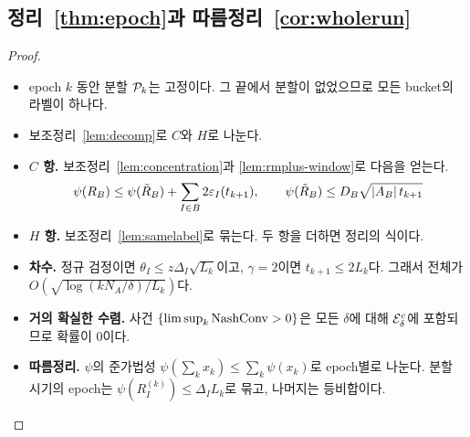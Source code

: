 \subsection{정리~\ref{thm:epoch}과 따름정리~\ref{cor:wholerun}}
\begin{proof}\mbox{}
\begin{itemize}
  \item epoch $k$ 동안 분할 $\mathcal{P}_k$는 고정이다. 그 끝에서 분할이 없었으므로 모든 bucket의 라벨이 하나다.
  \item 보조정리~\ref{lem:decomp}로 $C$와 $H$로 나눈다.
  \item \textbf{$C$ 항.} 보조정리~\ref{lem:concentration}과 \ref{lem:rmplus-window}로 다음을 얻는다.
    \[
    \psi(R_B)\le\psi(\tilde R_B)+\sum_{I\in B}2\varepsilon_I(t_{k+1}),\qquad\psi(\tilde R_B)\le D_B\sqrt{\left\lvert A_B\right\rvert t_{k+1}}
    \]
  \item \textbf{$H$ 항.} 보조정리~\ref{lem:samelabel}로 묶는다. 두 항을 더하면 정리의 식이다.
  \item \textbf{차수.} 정규 검정이면 $\theta_I\le z\Delta_I\sqrt{L_k}$이고, $\gamma=2$이면 $t_{k+1}\le2L_k$다. 그래서 전체가 $O(\sqrt{\log(kN_A/\delta)/L_k})$다.
  \item \textbf{거의 확실한 수렴.} 사건 $\{\limsup_k\mathrm{NashConv}>0\}$은 모든 $\delta$에 대해 $\mathcal{E}_\delta^c$에 포함되므로 확률이 0이다.
  \item \textbf{따름정리.} $\psi$의 준가법성 $\psi(\sum_kx_k)\le\sum_k\psi(x_k)$로 epoch별로 나눈다. 분할 시기의 epoch는 $\psi(R_I^{(k)})\le\Delta_IL_k$로 묶고, 나머지는 등비합이다.
\end{itemize}
\end{proof}

